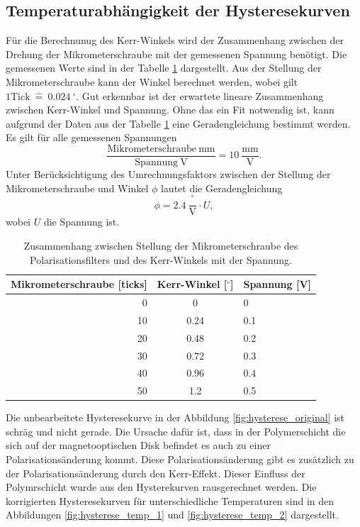 \subsection{Temperaturabhängigkeit der Hysteresekurven}
Für die Berechnunug des Kerr-Winkels wird der Zusammenhang zwischen der Drehung der Mikrometerschraube mit der gemessenen Spannung benötigt. Die gemessenen Werte sind in der Tabelle \ref{tab:Mikrometerschraube} dargestellt. Aus der Stellung der Mikrometerschraube kann der Winkel berechnet werden, wobei gilt $ 1 \mathrm{Tick}\ \widehat{=}\ 0.024\ {}^\circ$. Gut erkennbar ist der erwartete lineare Zusammenhang zwischen Kerr-Winkel und Spannung. Ohne das ein Fit notwendig ist, kann aufgrund der Daten aus der Tabelle \ref{tab:Mikrometerschraube} eine Geradengleichung bestimmt werden. Es gilt für alle gemessenen Spannungen
\begin{equation}
\frac{\mathrm{Mikrometerschraube}\ \mathrm{mm}} {\mathrm{Spannung}\ \mathrm{V}} = 10\ \frac{\mathrm{mm}}{\mathrm{V}}.
\end{equation}
Unter Berücksichtigung des Umrechnungsfaktors zwischen der Stellung der Mikrometerschraube und Winkel $\phi$ lautet die Geradengleichung 
\begin{equation}
\phi = 2.4\ \frac{{ }^\circ}{\mathrm{V}} \cdot U,
\end{equation}
wobei $U$ die Spannung ist. 

\begin{table}[h]
    \centering
    \caption{
        Zusammenhang zwischen Stellung der Mikrometerschraube des Polarisationsfilters und  des Kerr-Winkels mit der Spannung.
        }
    \label{tab:Mikrometerschraube}
    \begin{tabular}{r|c|l}
    Mikrometerschraube [ticks] & Kerr-Winkel [${}^\circ$]& Spannung [V] \\\hline
    0  & 0 & 0
 \\
    10 & 0.24 & 0.1
 \\
    20 & 0.48 & 0.2
 \\
    30 & 0.72 & 0.3
 \\
    40 & 0.96 & 0.4
 \\
    50 & 1.2 & 0.5 \\   
    \end{tabular}
\end{table}
Die unbearbeitete Hysteresekurve in der Abbildung \ref{fig:hysterese_original} ist schräg und nicht gerade. Die Ursache dafür ist, dass in der Polymerschicht die sich auf der magnetooptischen Disk befindet es auch zu einer Polarisationsänderung kommt. Diese Polarisationsänderung gibt es zusätzlich zu der Polarisationsänderung durch den Kerr-Effekt. Dieser Einfluss der Polymrschicht wurde aus den Hysterekurven rausgerechnet werden. Die korrigierten Hysteresekurven für unterschiedliche Temperaturen  sind in den Abbildungen \ref{fig:hysterese_temp_1} und \ref{fig:hysterese_temp_2} dargestellt. 


